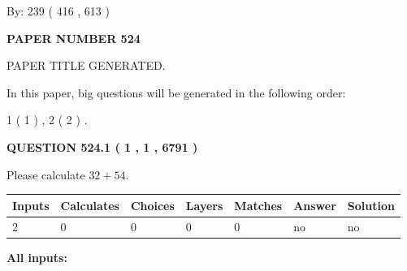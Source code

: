 \documentclass[12pt]{article}
\begin{document}
   
\hspace{1.0in} By: 
 239 ( 416 ,  613 )
   
   
   
   
\newpage 
\setcounter{page}{ 
   524001 } 
   
   
   
   
 {\textbf{ \Large{ PAPER NUMBER  524  }}}
   
   
\vspace{0.2in}
   
   
   
   
   
   
   
   
 \vspace{0.2in}
 
 
 
 
   
   
 PAPER TITLE GENERATED.
   
   
   
\vspace{0.2in}
   
In this paper, big questions will be generated in the following order: 
   
   
   1 ( 1 )
 ,
   2 ( 2 )
 .
  
\vspace{0.2in}
  
{\textbf{\Large{QUESTION
524.1 
 ( 1 , 1 , 6791 )
}}}
  
  
 
Please calculate $ %
32 +  %
54 $.
 
 
   
   
   
   
\noindent\begin{tabular}{|l|l|l|l|l|l|l|}
 \hline
Inputs & Calculates & Choices & Layers & Matches & Answer & Solution \\ \hline
 2  & 
 0  & 
 0
  & 
 0  & 
 0  & 
  no & 
  no 
  \\ \hline
 \end{tabular}
   
   
   
   
\noindent{}
   
   
   
   
\noindent\vspace{0.1in}\hspace{-0.08in} {\textbf{\Large{All inputs: }}}
   
\end{document}
